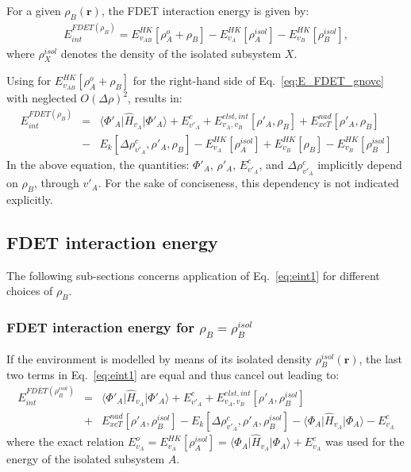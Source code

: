 \documentclass[amsmath,amssymb,preprint,aip,jcp]{revtex4-1}
\begin{document}
For a given $\rho_B(\mathbf{r})$,
the FDET interaction energy is given by:
\begin{eqnarray}
E_{int}^{FDET(\rho_B)}=E_{v_{AB}}^{HK}[\rho_A^{o}+\rho_B] - E_{v_A}^{HK}[\rho_A^{isol}] - 
E_{v_B}^{HK}[\rho_B^{isol}], \label{eq:eint0}
\end{eqnarray}
where $\rho_X^{isol}$ denotes the density of the isolated subsystem $X$.

Using for $E_{v_{AB}}^{HK}[\rho_A^{o}+\rho_B]$ for the right-hand side of Eq.~\ref{eq:E_FDET_gnovc} with neglected $O(\Delta\rho)^2$, results in:
\begin{eqnarray}
E_{int}^{FDET(\rho_B)}&=&
\langle\Phi'_{A}\vert \hat{H}_{v_A}\vert \Phi'_{A}\rangle + E^{c}_{v'_A}
+ E^{elst,int}_{v_A,v_B}[\rho'_A,\rho_B] + {E}_{xcT}^{nad}[\rho'_A,\rho_B] \label{eq:eint1}\\
&-& E_k[\Delta \rho^{c}_{v'_A}, \rho'_A, \rho_B] - E_{v_A}^{HK}[\rho_A^{isol}] + {E}^{HK}_{v_B}[\rho_B] - 
E_{v_B}^{HK}[\rho_B^{isol}] \nonumber
\end{eqnarray}
In the above equation, the quantities: $\Phi'_{A}$, $\rho'_A$, $E^{c}_{v'_A}$, and $\Delta \rho^{c}_{v'_A}$ implicitly depend on $\rho_B$, through $v'_A$. For the sake of conciseness, this dependency is not indicated explicitly. 
\subsection{FDET interaction energy}
The following sub-sections concerns application of Eq.~\ref{eq:eint1} for different choices of $\rho_B$. 
\subsubsection{FDET interaction energy for $\rho_B=\rho_B^{isol}$}
If the environment is modelled by means of its isolated density $\rho_B^{isol}(\mathbf{r})$, the last two terms in Eq.~\ref{eq:eint1} are equal and thus cancel out leading to:
\begin{eqnarray}
E_{int}^{FDET(\rho_B^{isol})}&=&
\langle\Phi'_{A}\vert \hat{H}_{v_A}\vert \Phi'_{A}\rangle + E^{c}_{v'_A}
+ E^{elst,int}_{v_A,v_B}[\rho'_A,\rho_B^{isol}] \label{eq:eint2}\\
&+& {E}_{xcT}^{nad}[\rho'_A,\rho_B^{isol}] - E_k[\Delta \rho^{c}_{v'_A}, \rho'_A, \rho_B^{isol}] - 
\langle\Phi_{A}\vert \hat{H}_{v_A}\vert \Phi_{A}\rangle - E^{c}_{v_A}
\nonumber
\end{eqnarray}
where the exact relation $E_{v_A}^o=E_{v_A}^{HK}[\rho_A^{isol}]=\langle\Phi_{A}\vert \hat{H}_{v_A}\vert \Phi_{A}\rangle + E^{c}_{v_A}$ was used for the energy of the isolated subsystem $A$.
\end{document}
